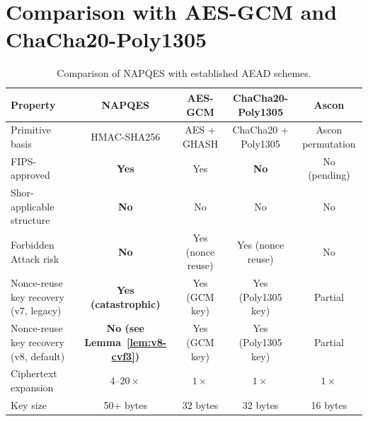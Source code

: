 \documentclass[11pt,a4paper]{article}
\begin{document}
\section{Comparison with AES-GCM and ChaCha20-Poly1305}
\label{sec:comparison}

\begin{table}[h]
\centering
\begin{tabular}{@{}lcccc@{}}
\toprule
Property & NAPQES & AES-GCM & ChaCha20-Poly1305 & Ascon \\
\midrule
Primitive basis & HMAC-SHA256 & AES + GHASH & ChaCha20 + Poly1305 & Ascon permutation \\
FIPS-approved & \textbf{Yes} & Yes & \textbf{No} & No (pending) \\
Shor-applicable structure & \textbf{No} & No & No & No \\
Forbidden Attack risk & \textbf{No} & Yes (nonce reuse) & Yes (nonce reuse) & No \\
Nonce-reuse key recovery (v7, legacy) & \textbf{Yes (catastrophic)}\footnotemark & Yes (GCM key) & Yes (Poly1305 key) & Partial \\
Nonce-reuse key recovery (v8, default) & \textbf{No (see Lemma~\ref{lem:v8-cvf3})} & Yes (GCM key) & Yes (Poly1305 key) & Partial \\
Ciphertext expansion & $4\text{--}20\times$ & $1\times$ & $1\times$ & $1\times$ \\
Key size & 50+ bytes & 32 bytes & 32 bytes & 16 bytes \\
\bottomrule
\end{tabular}
\caption{Comparison of NAPQES with established AEAD schemes.}
\label{tab:comparison}
\end{table}
\end{document}
